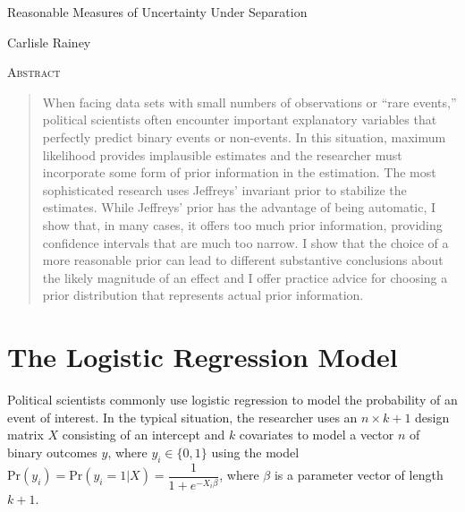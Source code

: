 \documentclass[12pt]{article}
\begin{document}
\begin{center}
{\LARGE Reasonable Measures of Uncertainty Under Separation}

\vspace{10mm}

Carlisle Rainey

\end{center}

\thispagestyle{empty}

\vspace{10mm}
{\centerline{\textsc{Abstract}}}
\begin{quote}\noindent When facing data sets with small numbers of observations or ``rare events,'' political scientists often encounter important explanatory variables that perfectly predict binary events or non-events. In this situation, maximum likelihood provides implausible estimates and the researcher must incorporate some form of prior information in the estimation. The most sophisticated research uses Jeffreys' invariant prior to stabilize the estimates. While Jeffreys' prior has the advantage of being automatic, I show that, in many cases, it offers too much prior information, providing confidence intervals that are much too narrow. I show that the choice of a more reasonable prior can lead to different substantive conclusions about the likely magnitude of an effect and I offer practice advice for choosing a prior distribution that represents actual prior information.\end{quote}


\newpage
\doublespace

\section*{The Logistic Regression Model}

Political scientists commonly use logistic regression to model the probability of an event of interest. In the typical situation, the researcher uses an $n \times k + 1$ design matrix $X$ consisting of an intercept and $k$ covariates to model a vector $n$ of binary outcomes $y$, where $y_i \in \{0, 1\}$ using the model $\text{Pr}(y_i) = \text{Pr}(y_i = 1 | X) = \dfrac{1}{1 + e^{-X_i\beta}}$, where $\beta$ is a parameter vector of length $k + 1$. 
\end{document}
